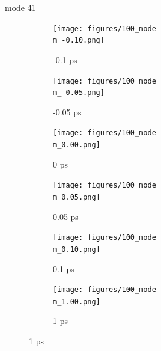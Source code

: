 \documentclass{beamer}
\newcommand\w{0.32}
\begin{document}
\renewcommand\m{41}
\begin{frame}{mode \m}
	\begin{figure}
		\centering
		\begin{subfigure}[b]{\w\textwidth}
			\centering
			\texttt{[image: figures/100\_mode\\m\_-0.10.png]}
			\caption{-0.1 ps}
		\end{subfigure}
		\begin{subfigure}[b]{\w\textwidth}
			\centering
			\texttt{[image: figures/100\_mode\\m\_-0.05.png]}
			\caption{-0.05 ps}
		\end{subfigure}
		\begin{subfigure}[b]{\w\textwidth}
			\centering
			\texttt{[image: figures/100\_mode\\m\_0.00.png]}
			\caption{0 ps}
		\end{subfigure}
		\begin{subfigure}[b]{\w\textwidth}
			\centering
			\texttt{[image: figures/100\_mode\\m\_0.05.png]}
			\caption{0.05 ps}
		\end{subfigure}
		\begin{subfigure}[b]{\w\textwidth}
			\centering
			\texttt{[image: figures/100\_mode\\m\_0.10.png]}
			\caption{0.1 ps}
		\end{subfigure}
		\begin{subfigure}[b]{\w\textwidth}
			\centering
			\texttt{[image: figures/100\_mode\\m\_1.00.png]}
			\caption{1 ps}
		\end{subfigure}
	\end{figure}
\end{frame}
\end{document}
